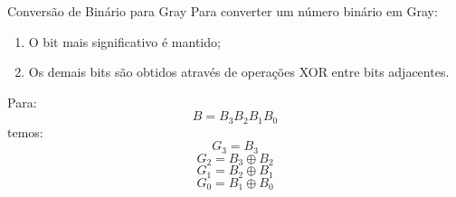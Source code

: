 \begin{frame}{Conversão de Binário para Gray}
    \small
    Para converter um número binário em Gray:

    \begin{enumerate}
        \item O bit mais significativo é mantido;
        \item Os demais bits são obtidos através de operações XOR
        entre bits adjacentes.
    \end{enumerate}
    Para:
    \[
        B = B_3B_2B_1B_0
    \]
    temos:
    \[
        G_3 = B_3
    \]
    \[
        G_2 = B_3 \oplus B_2
    \]
    \[
        G_1 = B_2 \oplus B_1
    \]
    \[
        G_0 = B_1 \oplus B_0
    \]
\end{frame}